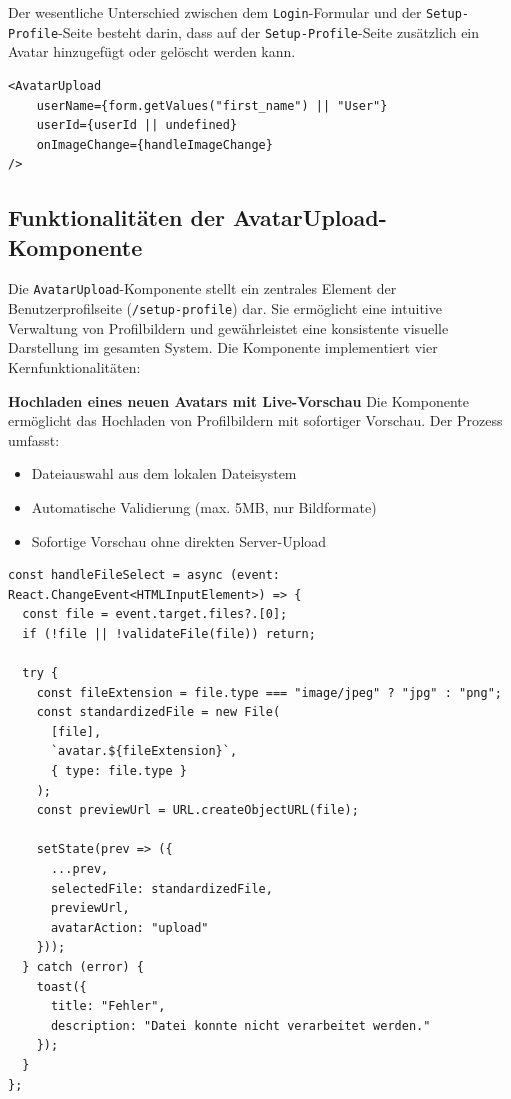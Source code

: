 \begin{inhalt}
Der wesentliche Unterschied zwischen dem \texttt{Login}-Formular und der \texttt{Setup-Profile}-Seite besteht darin, dass auf der \texttt{Setup-Profile}-Seite zusätzlich ein Avatar hinzugefügt oder gelöscht werden kann.

\begin{lstlisting}[style=mytsx]
<AvatarUpload
    userName={form.getValues("first_name") || "User"}
    userId={userId || undefined}
    onImageChange={handleImageChange}
/>
\end{lstlisting}

\subsection{Funktionalitäten der AvatarUpload-Komponente}

Die \texttt{AvatarUpload}-Komponente stellt ein zentrales Element der Benutzerprofilseite (\texttt{/setup-profile}) dar. Sie ermöglicht eine intuitive Verwaltung von Profilbildern und gewährleistet eine konsistente visuelle Darstellung im gesamten System. Die Komponente implementiert vier Kernfunktionalitäten:

\vspace{1cm}

\textbf{Hochladen eines neuen Avatars mit Live-Vorschau}
\vspace{0.1cm}
Die Komponente ermöglicht das Hochladen von Profilbildern mit sofortiger Vorschau. Der Prozess umfasst:
\begin{itemize}
    \item Dateiauswahl aus dem lokalen Dateisystem
    \item Automatische Validierung (max. 5MB, nur Bildformate)
    \item Sofortige Vorschau ohne direkten Server-Upload
\end{itemize}

\begin{lstlisting}[style=mytsx, caption={Implementierung des Avatar-Uploads mit Validierung}, label={lst:avatar_upload}]
const handleFileSelect = async (event: React.ChangeEvent<HTMLInputElement>) => {
  const file = event.target.files?.[0];
  if (!file || !validateFile(file)) return;

  try {
    const fileExtension = file.type === "image/jpeg" ? "jpg" : "png";
    const standardizedFile = new File(
      [file], 
      `avatar.${fileExtension}`, 
      { type: file.type }
    );
    const previewUrl = URL.createObjectURL(file);

    setState(prev => ({
      ...prev,
      selectedFile: standardizedFile,
      previewUrl,
      avatarAction: "upload"
    }));
  } catch (error) {
    toast({
      title: "Fehler",
      description: "Datei konnte nicht verarbeitet werden."
    });
  }
};
\end{lstlisting}


\end{inhalt}
